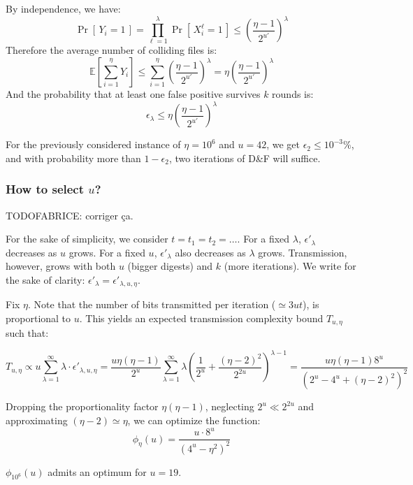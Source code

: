 \documentclass[11pt]{llncs}
\newcommand{\Prob}[1]{{\Pr\left[\,{#1}\,\right]}}
\newcommand{\EE}[1]{{\mathbb{E}\left[{#1}\right]}}
\newcommand{\df}{D\&F\xspace}
\begin{document}
By independence, we have:
\[
  \Prob{Y_i = 1} = \prod_{\ell=1}^\lambda \Prob{X^{\ell}_i = 1} \le \left( \frac{\eta -1}{2^{u'}} \right)^\lambda
\]
Therefore the average number of colliding files is:
\[
  \EE{\sum_{i=1}^{\eta} Y_i} \le \sum_{i=1}^{\eta} \left( \frac{\eta -1}{2^{u'}} \right)^\lambda =  \eta \left(\frac{\eta - 1}{2^{u'}}\right)^\lambda
\]
And the probability that at least one false positive survives $k$ rounds is:
\[
  \epsilon_\lambda \le \eta \left(\frac{\eta - 1}{2^{u'}}\right)^\lambda
\]

For the previously considered instance of $\eta=10^6$ and $u=42$, we get $\epsilon_2 \le 10^{-3} \%$, and with probability more than $1-\epsilon_2$, two iterations of \df will suffice.



\subsubsection{How to select $u$?}
TODOFABRICE: corriger ça.

For the sake of simplicity, we consider $t=t_1=t_2=\dots$.
For a fixed $\lambda$, $\epsilon'_\lambda$ decreases as $u$ grows. For a fixed $u$, $\epsilon'_\lambda$ also decreases as $\lambda$ grows. Transmission, however, grows with both $u$ (bigger digests) and $k$ (more iterations). We write for the sake of clarity: $\epsilon'_\lambda = \epsilon'_{\lambda,u,\eta}$.

Fix $\eta$. Note that the number of bits transmitted per iteration ($\simeq 3ut$), is proportional to $u$. This yields an expected transmission complexity bound $T_{u,\eta}$ such that:

\[T_{u,\eta} \propto u \sum_{\lambda=1}^{\infty} \lambda \cdot \epsilon'_{\lambda,u,\eta}=
\frac{u \eta\left(\eta-1\right)}{2^u} \sum_{\lambda=1}^{\infty} \lambda \left( \frac{1}{2^u} + \frac{\left(\eta-2\right)^2}{2^{2u}} \right)^{\lambda-1}=
\frac{u \eta\left(\eta-1\right) 8^u}{\left(2^u-4^u+\left(\eta-2\right)^2\right)^2}\]

Dropping the proportionality factor $\eta\left(\eta-1\right)$, neglecting $2^u \ll 2^{2u}$ and approximating $(\eta-2)\simeq\eta$, we can optimize the function:
\nopagebreak
\[
\phi_\eta(u)=\frac{u \cdot 8^u}{\left(4^u-\eta^2\right)^2}
\]

$\phi_{10^6}(u)$ admits an optimum for $u=19$.
\end{document}
